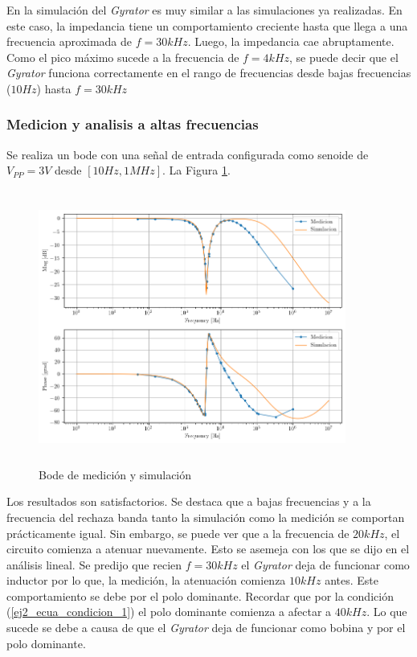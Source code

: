 En la simulación del \textit{Gyrator} es muy similar a las simulaciones ya realizadas. En este caso, la impedancia tiene un comportamiento creciente hasta que llega a una frecuencia aproximada de $f = 30 kHz$. Luego, la impedancia cae abruptamente. Como el pico máximo sucede a la frecuencia de $f=4kHz$, se puede decir que el \textit{Gyrator} funciona correctamente en el rango de frecuencias desde bajas frecuencias ($10Hz$) hasta $f = 30kHz$

\subsubsection{Medicion y analisis a altas frecuencias}

Se realiza un bode con una señal de entrada configurada como senoide de $V_{PP} = 3V$ desde $[10Hz , 1MHz]$. La Figura \ref{fig:ej2_hp_med_and_sim}.

\begin{figure}[h!]                                                    
\centering\includegraphics[width=0.9\textwidth, height=9cm]{../Ex2/Resources/ej2_br_med_and_sim.png}
\caption{Bode de medición y simulación}
\label{fig:ej2_hp_med_and_sim}
\end{figure}

Los resultados son satisfactorios. Se destaca que a bajas frecuencias y a la frecuencia del rechaza banda tanto la simulación como la medición se comportan prácticamente igual. Sin embargo, se puede ver que a la frecuencia de $20kHz$, el circuito comienza a atenuar nuevamente. Esto se asemeja con los que se dijo en el análisis lineal. Se predijo que recien $f = 30kHz$ el \textit{Gyrator} deja de funcionar como inductor por lo que, la medición, la atenuación comienza $10kHz$ antes. Este comportamiento se debe por el polo dominante. Recordar que por la condición (\ref{ej2_ecua_condicion_1}) el polo dominante comienza a afectar a $40 kHz$. Lo que sucede se debe a causa de que el \textit{Gyrator} deja de funcionar como bobina y por el polo dominante.  




